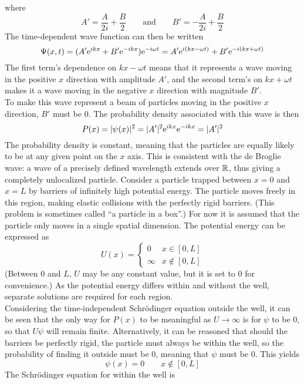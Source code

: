\documentclass{subfiles}
\begin{document}
				where
				\[
					A' = \frac{A}{2i} + \frac{B}{2} \qquad \text{and} \qquad
						B' = -\frac{A}{2i} + \frac{B}{2}
				\]
				The time-dependent wave function can then be written
				\[
					\Psi(x, t) = (A'\text{e}^{ikx} + B'\text{e}^{-ikx})\text{e}^{-i\omega t}
						= A'\text{e}^{i(kx - \omega t)} + B'\text{e}^{-i(kx + \omega t)}
				\]
				The first term's dependence on \(kx - \omega t\) means that it represents a wave moving in the positive \(x\) direction with amplitude \(A'\), and the second term's on \(kx + \omega t\) makes it a wave moving in the negative \(x\) direction with magnitude \(B'\). \\
				To make this wave represent a beam of particles moving in the positive \(x\) direction, \(B'\) must be 0. The probability density associated with this wave is then
				\[
					P(x) = |\psi(x)|^2
						= |A'|^2\text{e}^{ikx}\text{e}^{-ikx}
						= |A'|^2
				\]
				The probability density is constant, meaning that the particles are equally likely to be at any given point on the \(x\) axis. This is consistent with the de Broglie wave: a wave of a precisely defined wavelength extends over \(\mathbb{R}\), thus giving a completely unlocalized particle.
			Consider a particle trapped between \(x = 0\) and \(x = L\) by barriers of infinitely high potential energy. The particle moves freely in this region, making elastic collisions with the perfectly rigid barriers. (This problem is sometimes called \enquote{a particle in a box}.) For now it is assumed that the particle only moves in a single spatial dimension. The potential energy can be expressed as
				\[
					U(x) = \begin{cases}
 							0 & x \in [0, L] \\
 							\infty & x \notin [0, L]
 						\end{cases}
				\]
				(Between 0 and \(L\), \(U\) may be any constant value, but it is set to 0 for convenience.) As the potential energy differs within and without the well, separate solutions are required for each region. \\
				Considering the time-independent Schr\"odinger equation outside the well, it can be seen that the only way for \(P(x)\) to be meaningful as \(U \to \infty\) is for \(\psi\) to be 0, so that \(U\psi\) will remain finite. Alternatively, it can be reasoned that should the barriers be perfectly rigid, the particle must always be within the well, so the probability of finding it outside must be 0, meaning that \(\psi\) must be 0. This yields
				\[\psi(x) = 0 \qquad x \notin [0, L]\]
				The Schr\"odinger equation for within the well is
\end{document}
